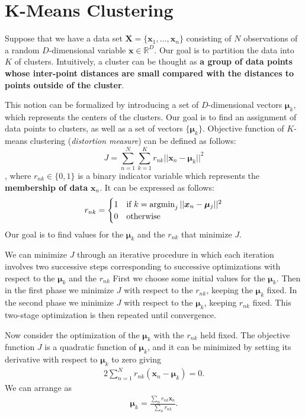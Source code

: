 \section{K-Means Clustering}

Suppose that we have a data set $\mathbf{X} = \{\mathbf{x}_1,\dots, \mathbf{x}_n\}$ consisting of $N$ observations of a random $D$-dimensional variable $\mathbf{x}\in \mathbb{R}^{D}$. Our goal is to partition the data into $K$ of clusters.  Intuitively, a cluster can be thought as \textbf{a group of data points whose inter-point distances are small compared with the distances to points outside of the cluster}.

This notion can be formalized by introducing a set of $D$-dimensional vectors $\boldsymbol{\mu}_k$, which represents the centers of the clusters. Our goal is to find an assignment of data points to clusters, as well as a set of vectors $\{\boldsymbol{\mu}_k\}$. Objective function of $K$-means clustering (\textit{distortion measure}) can be defined as follows:
$$J =  \sum_{n=1}^{N}\sum_{k=1}^{K}r_{nk}||\boldsymbol{x}_n-\boldsymbol{\mu}_k||^2$$
, where $r_{nk}\in\{0,1\}$ is a binary indicator variable which represents the \textbf{membership of data} $\mathbf{x}_n$. It can be expressed as follows: 
\begin{align*}
	r_{nk}=\begin{cases}
1 & \textrm{if } k=\operatorname*{\operatorname{argmin}}_{j} ||\boldsymbol{x}_n-\boldsymbol{\mu}_j||^2\\
0 & \textrm{otherwise}
\end{cases}
\end{align*}
Our goal is to find values for the $\boldsymbol{\mu}_k$ and the $r_{nk}$ that minimize $J$. 

We can minimize $J$ through an iterative procedure in which each iteration involves two successive steps corresponding to successive optimizations with respect to the $\boldsymbol{\mu}_k$ and the $r_{nk}$ First we choose some initial values for the $\boldsymbol{\mu}_k$. Then in the first phase we minimize $J$ with respect to the $r_{nk}$, keeping the $\boldsymbol{\mu}_k$ fixed. In the second phase we minimize $J$ with respect to the $\boldsymbol{\mu}_k$, keeping $r_{nk}$ fixed. This two-stage optimization is then repeated until convergence.


Now consider the optimization of the $\boldsymbol{\mu}_k$ with the $r_{nk}$ held fixed. The objective function $J$ is a quadratic function of $\boldsymbol{\mu}_k$, and it can be minimized by setting its derivative with respect to $\boldsymbol{\mu}_k$ to zero giving
\begin{align*}
2\sum_{n=1}^{N}r_{nk}(\boldsymbol{x}_n-\boldsymbol{\mu}_k) = 0.
\end{align*}
We can arrange as
\begin{align*}
\boldsymbol{\mu}_k = \frac{\sum_n r_{nk}\boldsymbol{x}_n}{\sum_n r_{nk}}.
\end{align*}

